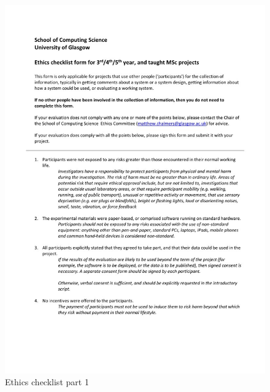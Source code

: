 \documentclass{l4proj}
\begin{document}
\begin{appendices}
\begin{figure}[h!]
    \centering
    \includegraphics[width=13.5cm]{./images/ethics1.jpg}
    \caption{Ethics checklist part 1}
\end{figure}
\pagebreak


\end{appendices}
\end{document}
